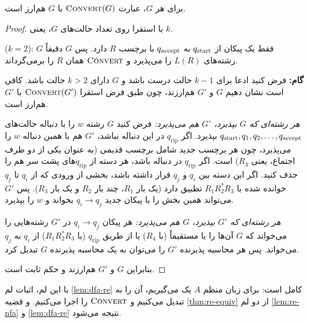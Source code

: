 \begin{lemma}
برای هر  $G$، عبارت $\textsc{Convert}(G)$ با $G$ هم‌ارز است.
\end{lemma}
\begin{proof}
با استقرا روی تعداد حالت‌های $G$، یعنی $k$.

 ($k=2$): $G$ فقط یک پیکان از $q_{\mathrm{start}}$ به $q_{\mathrm{accept}}$ با برچسب $R$ دارد. پس $G$ دقیقاً رشته‌های $L(R)$ را می‌پذیرد و $\textsc{Convert}$ همان $R$ را برمی‌گرداند.

\textbf{گام:} فرض کنید ادعا برای $k-1$ حالت درست باشد و $G$ دارای $k>2$ حالت باشد. کافی است نشان دهیم $G$ و $G'$ هم‌ارزند، چون طبق فرض استقرا $\textsc{Convert}(G')$ با $G'$ هم‌ارز است.

\emph{هر رشته‌ای که $G$ بپذیرد، $G'$ هم می‌پذیرد:} فرض کنید $G$ رشته $w$ را با دنباله حالت‌های $q_{\mathrm{start}},q_1,q_2,\dots,q_{\mathrm{accept}}$ بپذیرد. اگر $q_{\mathrm{rip}}$ در این دنباله نباشد، $G'$ هم با همین دنباله $w$ را می‌پذیرد، چون هر برچسب جدید شامل برچسب قدیمی (به عنوان یکی از دو طرف اجتماع، یعنی $R_4$) است. اگر $q_{\mathrm{rip}}$ در دنباله باشد، هر دسته از $q_{\mathrm{rip}}$های پشت سر هم را حذف کنید. اگر این دسته بین $q_i$ و $q_j$ قرار داشته باشد، بخشی از ورودی که از $q_i$ تا $q_j$ خوانده شده با $R_1R_2^*R_3$ تطبیق دارد (یک بار $R_1$، چند بار $R_2$ و یک بار $R_3$). پس $G'$ می‌تواند همین بخش را با پیکان جدید $q_i\to q_j$ بخواند و $w$ را بپذیرد.

\emph{هر رشته‌ای که $G'$ بپذیرد، $G$ هم می‌پذیرد:} هر پیکان $q_i\to q_j$ در $G'$ رشته‌هایی را می‌خواند که $G$ آن‌ها را یا مستقیماً (با $R_4$) یا از طریق $q_{\mathrm{rip}}$ (با $R_1R_2^*R_3$) از $q_i$ به $q_j$ می‌خواند. پس هر محاسبه پذیرنده $G'$ را می‌توان به یک محاسبه پذیرنده $G$ تبدیل کرد.

بنابراین $G$ و $G'$ هم‌ارزند و حکم ثابت است.
\end{proof}

با این لم، اثبات لم \ref{lem:dfa-re} کامل است: برای زبان منظم $A$ یک  می‌گیریم، آن را به  تبدیل می‌کنیم و $\textsc{Convert}$ را اجرا می‌کنیم. و قضیه \ref{thm:re-equiv} از دو لم \ref{lem:re-nfa} و \ref{lem:dfa-re} نتیجه می‌شود.

